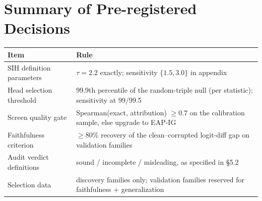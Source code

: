 \documentclass[11pt,a4paper]{article}
\begin{document}
\section{Summary of Pre-registered Decisions}
\begin{center}\small
\begin{tabular}{lp{9.6cm}}
\toprule
Item & Rule \\
\midrule
SIH definition parameters & $\tau=2.2$ exactly; sensitivity $\{1.5,3.0\}$ in appendix \\
Head selection threshold & 99.9th percentile of the random-triple null (per statistic); sensitivity at 99/99.5 \\
Screen quality gate & Spearman(exact, attribution) $\ge 0.7$ on the calibration sample, else upgrade to EAP-IG \\
Faithfulness criterion & $\ge 80\%$ recovery of the clean--corrupted logit-diff gap on validation families \\
Audit verdict definitions & sound / incomplete / misleading, as specified in \S5.2 \\
Selection data & discovery families only; validation families reserved for faithfulness + generalization \\
\bottomrule
\end{tabular}
\end{center}
\end{document}
